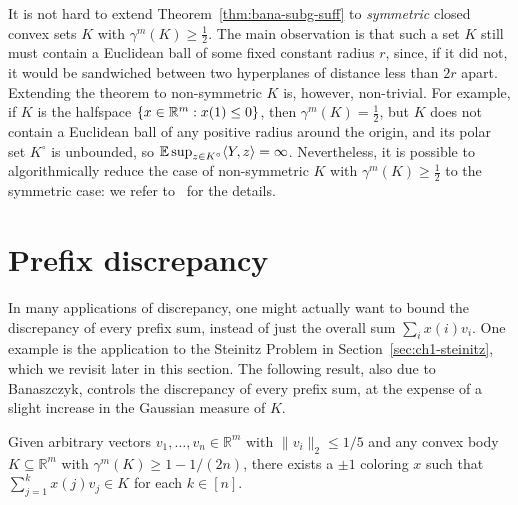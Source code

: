 It is not hard to extend Theorem~\ref{thm:bana-subg-suff} to \emph{symmetric} closed
convex sets $K$ with $\gamma^m(K) \ge \frac12$. The main observation
is that such a set $K$ still must contain a Euclidean ball of some
fixed constant radius $r$, since, if it did not, it would be
sandwiched between two hyperplanes of distance less than $2r$
apart. Extending the theorem to non-symmetric $K$ is, however,
non-trivial. For example, if $K$ is the halfspace $\{x \in \mathbb{R}^m: x(1)
\le 0\}$, then $\gamma^m(K) = \frac12$, but $K$ does not contain a
Euclidean ball of any positive radius around the origin, and its polar
set $K^\circ$ is unbounded, so $\mathbb{E} \sup_{z \in K^\circ} \langle Y,z\rangle =
\infty$. Nevertheless, it is possible to algorithmically reduce the
case of non-symmetric $K$ with $\gamma^m(K) \ge \frac12$ to the
symmetric case: we refer to~\cite{DGLN-journal} for the details.

\section{Prefix discrepancy}
In many applications of discrepancy, one might actually want to bound the discrepancy of every prefix sum, instead of just the overall sum $\sum_i x(i) v_i$. One example is the application to the Steinitz Problem in Section~\ref{sec:ch1-steinitz}, which we revisit later in this section.
The following result, also due to Banaszczyk, controls the discrepancy of every prefix sum, at the expense of a slight increase in the Gaussian measure of $K$. 

\begin{theorem}\label{thm:bana2}
 Given arbitrary vectors $v_1,\dots,v_n\in\mathbb{R}^m$ with $\|v_i\|_2 \leq 1/5$ and any
convex body $K\subseteq \mathbb{R}^m$ with $\gamma^m(K)\ge 1-1/(2n)$,
there exists a $\pm 1$ coloring $x$ such that $\sum_{j=1}^k x(j) v_j \in K$ for each $k\in [n]$.
\end{theorem}

